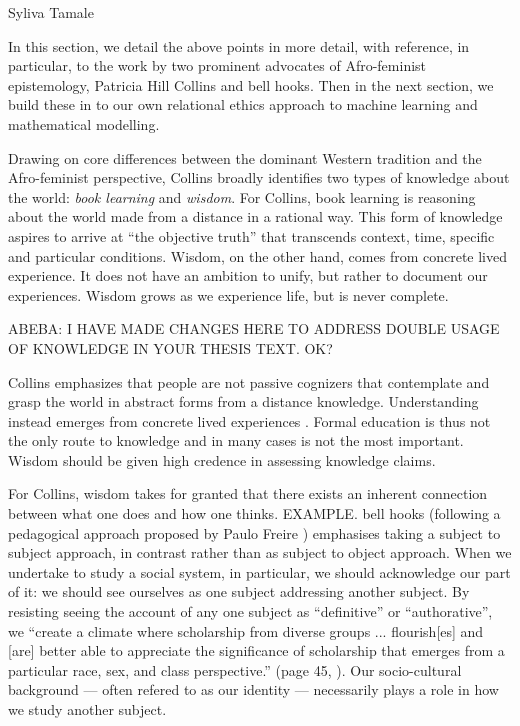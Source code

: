 Syliva Tamale 


In this section, we detail the above points in more detail, with reference, in particular, to the work by two prominent advocates of Afro-feminist epistemology, Patricia Hill Collins and bell hooks. Then in the next section, we build these in to our own relational ethics approach to machine learning and mathematical modelling.

Drawing on core differences between the dominant Western tradition and the Afro-feminist perspective, Collins broadly identifies two types of knowledge about the world: \textit{book learning} and \textit{wisdom}. For Collins, book learning is reasoning about the world made from a distance in a rational way. This form of knowledge aspires to arrive at ``the objective truth'' that transcends context, time, specific and particular conditions. Wisdom, on the other hand, comes from concrete lived experience. It does not have an ambition to unify, but rather to document our experiences. Wisdom grows as we experience life, but is never complete.


ABEBA: I HAVE MADE CHANGES HERE TO ADDRESS DOUBLE USAGE OF KNOWLEDGE IN YOUR THESIS TEXT. OK?

Collins emphasizes that people are not passive cognizers that contemplate and grasp the world in abstract forms from a distance knowledge. Understanding instead emerges from concrete lived experiences \cite{collins2002black}. Formal education is thus not the only route to knowledge and in many cases is not the most important. Wisdom should be given high credence in assessing knowledge claims.  

For Collins, wisdom takes for granted that there exists an inherent connection between what one does and how one thinks. EXAMPLE. bell hooks \cite{hooks1989talking} (following a pedagogical approach proposed by Paulo Freire \cite{freire1996pedagogy}) emphasises taking a subject to subject approach, in contrast rather than as subject to object approach. When we undertake to study a social system, in particular, we should acknowledge our part of it: we should see ourselves as one subject addressing another subject. By resisting seeing the account of any one subject as ``definitive'' or ``authorative'', we ``create a climate where scholarship from diverse groups ... flourish[es] and [are] better able to appreciate the significance of scholarship that emerges from a particular race, sex, and class perspective.'' (page 45, \cite{hooks1989talking}). Our socio-cultural background --- often refered to as our identity --- necessarily plays a role in how we study another subject.  


